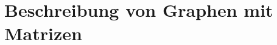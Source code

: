 %
%
%
\section{Beschreibung von Graphen mit Matrizen
\label{section:beschreibung-von-graphen-mit-matrizen}}

